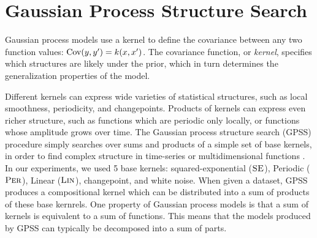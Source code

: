 \documentclass{article} %
\begin{document}


\section{Gaussian Process Structure Search}
\label{sec:gpss}

Gaussian process models\cite{rasmussen38gaussian} use a kernel to define the covariance between any two function values: ${\textrm{Cov}(y, y') = k(x,x')}$.
The covariance function, or \emph{kernel}, specifies which structures are likely under the \gp{} prior, which in turn determines the generalization properties of the model.

Different kernels can express wide varieties of statistical structures, such as local smoothness, periodicity, and changepoints.  Products of kernels can express even richer structure, such as functions which are periodic only locally, or functions whose amplitude grows over time.  The Gaussian process structure search (GPSS) procedure simply searches over sums and products of a simple set of base kernels, in order to find complex structure in time-series or multidimensional functions \cite{DuvLloGroetal13}.  In our experiments, we used 5 base kernels:  squared-exponential (${\textsc{SE}}$), Periodic (${\textsc{Per}}$), Linear (${\textsc{Lin}}$), changepoint, and white noise.
%
When given a dataset, GPSS produces a compositional kernel which can be distributed into a sum of products of these base kernrels. One property of Gaussian process models is that a sum of kernels is equivalent to a sum of functions.  This means that the models produced by GPSS can typically be decomposed into a sum of parts.

\end{document}
